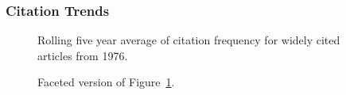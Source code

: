 \documentclass[
  10pt,
  letterpaper,
  DIV=11,
  numbers=noendperiod,
  twoside]{scrartcl}
\begin{document}
\subsubsection*{Citation Trends}\label{citation-trends}

\begin{figure}


\caption{\label{fig-citation-spaghetti-1976}Rolling five year average of
citation frequency for widely cited articles from 1976.}

\end{figure}%

\begin{figure}


\caption{\label{fig-citation-facet-1976}Faceted version of
Figure~\ref{fig-citation-spaghetti-1976}.}

\end{figure}%
\end{document}
